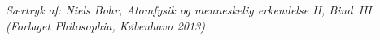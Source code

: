 \documentclass[12pt,a4paper]{article}
\begin{document}
\thispagestyle{fancy}
{\footnotesize\itshape Særtryk af: Niels Bohr, \emph{Atomfysik og menneskelig erkendelse II}, Bind~III
 (Forlaget Philosophia, K\o{}benhavn 2013).\par}
\medskip


\end{document}
